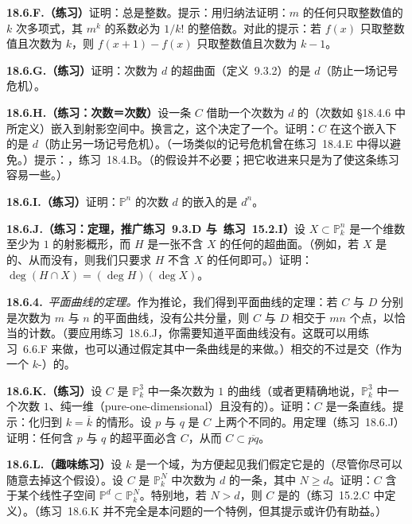 \textbf{18.6.F.（练习）}\quad 证明：\trDegree{}总是整数。提示：用归纳法证明：$m$ 的任何只取整数值的 $k$ 次多项式，其 $m^k$ 的系数必为 $1/k!$ 的整倍数。对此的提示：若 $f(x)$ 只取整数值且次数为 $k$，则 $f(x+1)-f(x)$ 只取整数值且次数为 $k-1$。

\textbf{18.6.G.（练习）}\quad 证明：次数为 $d$ 的超曲面（\mbox{定义~9.3.2}）的\trDegree{}是 $d$（防止一场记号危机）。

\textbf{18.6.H.（练习：次数＝次数）}\quad 设一条\trRegular{}\trCurve{} $C$ 借助一个次数为 $d$ 的\trInvertibleSheaf（次数如 \S18.4.6 中所定义）嵌入到射影空间中。换言之，这个\trLineBundle{}决定了一个\trClosedEmbedding。证明：$C$ 在这个嵌入下的\trDegree{}是 $d$（防止另一场记号危机）。（一场类似的记号危机曾在\mbox{练习~18.4.E} 中得以避免。）提示：\trRiemannRoch，\mbox{练习~18.4.B}。（\trRegularity{}的假设并不必要；把它收进来只是为了使这条练习容易一些。）

\textbf{18.6.I.（练习）}\quad 证明：$\mathbb{P}^n$ 的次数 $d$ 的\trVeronese{}嵌入的\trDegree{}是 $d^n$。

\textbf{18.6.J.（练习：\trBezout{}定理，推广\mbox{练习~9.3.D} 与~\mbox{练习~15.2.I}）}\quad 设 $X\subset\mathbb{P}^n_k$ 是一个维数至少为 $1$ 的射影概形，而 $H$ 是一张不含 $X$ 的任何\trAssociatedPoint{}的超曲面。（例如，若 $X$ 是\trReduced{}的、从而没有\trEmbeddedPoint，则我们只要求 $H$ 不含 $X$ 的任何\trIrreducibleComponent{}即可。）证明：$\deg(H\cap X)=(\deg H)(\deg X)$。

\textbf{18.6.4.}\ \emph{平面曲线的\trBezout{}定理。}\quad 作为推论，我们得到平面曲线的\trBezout{}定理：若 $C$ 与 $D$ 分别是次数为 $m$ 与 $n$ 的平面曲线，没有公共分量，则 $C$ 与 $D$ 相交于 $mn$ 个点，以恰当的\trMultiplicity{}计数。（要应用\mbox{练习~18.6.J}，你需要知道平面曲线没有\trEmbeddedPoint。这既可以用\mbox{练习~6.6.F} 来做，也可以通过假定其中一条曲线是\trReduced{}的来做。）相交的\trMultiplicity{}不过是交（作为一个 $k$-\trScheme）的\trDegree。

\textbf{18.6.K.（练习）}\quad 设 $C$ 是 $\mathbb{P}^3_k$ 中一条次数为 $1$ 的曲线（或者更精确地说，$\mathbb{P}^3_k$ 中一个次数 $1$、纯一维（pure-one-dimensional）且没有\trEmbeddedPoint{}的\trClosedSubscheme）。证明：$C$ 是一条直线。提示：化归到 $k=\overline{k}$ 的情形。设 $p$ 与 $q$ 是 $C$ 上两个不同的\trClosedPoint。用\trBezout{}定理（\mbox{练习~18.6.J}）证明：任何含 $p$ 与 $q$ 的超平面必含 $C$，从而 $C\subset\overline{pq}$。

\textbf{18.6.L.（趣味练习）}\quad 设 $k$ 是一个域，为方便起见我们假定它是\trAlgClosed{}的（尽管你尽可以随意去掉这个假设）。设 $C$ 是 $\mathbb{P}^N_k$ 中次数为 $d$ 的一条\trIntegral{}\trCurve，其中 $N\ge d$。证明：$C$ 含于某个线性子空间 $\mathbb{P}^d\subset\mathbb{P}^N_k$。特别地，若 $N>d$，则 $C$ 是\trDegenerate{}的（\mbox{练习~15.2.C} 中定义）。（\mbox{练习~18.6.K} 并不完全是本问题的一个特例，但其提示或许仍有助益。）

